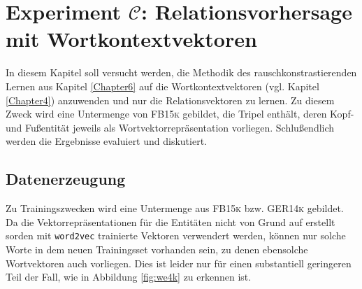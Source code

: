 
\chapter{Experiment $\mathcal{C}$: Relationsvorhersage mit Wortkontextvektoren} %

\label{Chapter8} %


In diesem Kapitel soll versucht werden, die Methodik des rauschkonstrastierenden Lernen aus Kapitel \ref{Chapter6}
auf die Wortkontextvektoren (vgl. Kapitel \ref{Chapter4}) anzuwenden und nur die Relationsvektoren zu lernen. Zu diesem Zweck
wird eine Untermenge von \textsc{FB15k} gebildet, die Tripel enthält, deren Kopf- und Fußentität jeweils als Wortvektorrepräsentation vorliegen.
Schlußendlich werden die Ergebnisse evaluiert und diskutiert.

\section{Datenerzeugung}

Zu Trainingszwecken wird eine Untermenge aus \textsc{FB15k} bzw. \textsc{GER14k} gebildet. Da
die Vektorrepräsentationen für die Entitäten nicht von Grund auf erstellt sorden mit
\verb|word2vec| trainierte Vektoren verwendert werden, können nur solche Worte in dem
neuen Trainingsset vorhanden sein, zu denen ebensolche Wortvektoren auch vorliegen.
Dies ist leider nur für einen substantiell geringeren Teil der Fall, wie in Abbildung \ref{fig:we4k} zu
erkennen ist.


